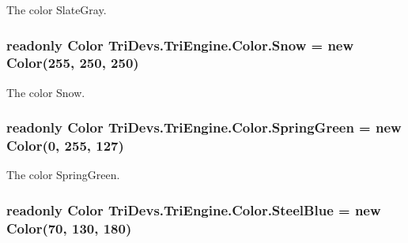 The color Slate\-Gray. 

\hypertarget{struct_tri_devs_1_1_tri_engine_1_1_color_a90a837f51ecebad035b922c3652c186d}{
\subsubsection[{Snow}]{\setlength{\rightskip}{0pt plus 5cm}readonly {\bf Color} Tri\-Devs.\-Tri\-Engine.\-Color.\-Snow = new {\bf Color}(255, 250, 250)\hspace{0.3cm}{\ttfamily [static]}}}\label{struct_tri_devs_1_1_tri_engine_1_1_color_a90a837f51ecebad035b922c3652c186d}


The color Snow. 

\hypertarget{struct_tri_devs_1_1_tri_engine_1_1_color_ad645d6dd3150a45d3c99367d1d6adf9b}{
\subsubsection[{Spring\-Green}]{\setlength{\rightskip}{0pt plus 5cm}readonly {\bf Color} Tri\-Devs.\-Tri\-Engine.\-Color.\-Spring\-Green = new {\bf Color}(0, 255, 127)\hspace{0.3cm}{\ttfamily [static]}}}\label{struct_tri_devs_1_1_tri_engine_1_1_color_ad645d6dd3150a45d3c99367d1d6adf9b}


The color Spring\-Green. 

\hypertarget{struct_tri_devs_1_1_tri_engine_1_1_color_a527b230df9dbf7edb6b2138868269e8f}{
\subsubsection[{Steel\-Blue}]{\setlength{\rightskip}{0pt plus 5cm}readonly {\bf Color} Tri\-Devs.\-Tri\-Engine.\-Color.\-Steel\-Blue = new {\bf Color}(70, 130, 180)\hspace{0.3cm}{\ttfamily [static]}}}\label{struct_tri_devs_1_1_tri_engine_1_1_color_a527b230df9dbf7edb6b2138868269e8f}



